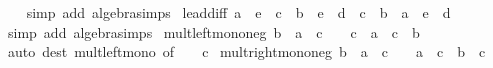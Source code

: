 \begin{isabellebody}
%
\isadelimproof
\ \ %
\endisadelimproof
%
\isatagproof
{}\isamarkupfalse%
\ {\isacharparenleft}{\kern0pt}simp\ add{\isacharcolon}{\kern0pt}\ algebra{\isacharunderscore}{\kern0pt}simps{\isacharparenright}{\kern0pt}%
\endisatagproof
{\isafoldproof}%
%
\isadelimproof
\isanewline
%
\endisadelimproof
\isanewline
{}\isamarkupfalse%
\ le{\isacharunderscore}{\kern0pt}add{\isacharunderscore}{\kern0pt}iff{}{\isacharcolon}{\kern0pt}\ {\isachardoublequoteopen}a\ {\isacharasterisk}{\kern0pt}\ e\ {\isacharplus}{\kern0pt}\ c\ {\isasymle}\ b\ {\isacharasterisk}{\kern0pt}\ e\ {\isacharplus}{\kern0pt}\ d\ {\isasymlongleftrightarrow}\ c\ {\isasymle}\ {\isacharparenleft}{\kern0pt}b\ {\isacharminus}{\kern0pt}\ a{\isacharparenright}{\kern0pt}\ {\isacharasterisk}{\kern0pt}\ e\ {\isacharplus}{\kern0pt}\ d{\isachardoublequoteclose}\isanewline
%
\isadelimproof
\ \ %
\endisadelimproof
%
\isatagproof
{}\isamarkupfalse%
\ {\isacharparenleft}{\kern0pt}simp\ add{\isacharcolon}{\kern0pt}\ algebra{\isacharunderscore}{\kern0pt}simps{\isacharparenright}{\kern0pt}%
\endisatagproof
{\isafoldproof}%
%
\isadelimproof
\isanewline
%
\endisadelimproof
\isanewline
{}\isamarkupfalse%
\ mult{\isacharunderscore}{\kern0pt}left{\isacharunderscore}{\kern0pt}mono{\isacharunderscore}{\kern0pt}neg{\isacharcolon}{\kern0pt}\ {\isachardoublequoteopen}b\ {\isasymle}\ a\ {\isasymLongrightarrow}\ c\ {\isasymle}\ {}\ {\isasymLongrightarrow}\ c\ {\isacharasterisk}{\kern0pt}\ a\ {\isasymle}\ c\ {\isacharasterisk}{\kern0pt}\ b{\isachardoublequoteclose}\isanewline
%
\isadelimproof
\ \ %
\endisadelimproof
%
\isatagproof
{}\isamarkupfalse%
\ {\isacharparenleft}{\kern0pt}auto\ dest{\isacharcolon}{\kern0pt}\ mult{\isacharunderscore}{\kern0pt}left{\isacharunderscore}{\kern0pt}mono\ {\isacharbrackleft}{\kern0pt}of\ {\isacharunderscore}{\kern0pt}\ {\isacharunderscore}{\kern0pt}\ {\isachardoublequoteopen}{\isacharminus}{\kern0pt}\ c{\isachardoublequoteclose}{\isacharbrackright}{\kern0pt}{\isacharparenright}{\kern0pt}%
\endisatagproof
{\isafoldproof}%
%
\isadelimproof
\isanewline
%
\endisadelimproof
\isanewline
{}\isamarkupfalse%
\ mult{\isacharunderscore}{\kern0pt}right{\isacharunderscore}{\kern0pt}mono{\isacharunderscore}{\kern0pt}neg{\isacharcolon}{\kern0pt}\ {\isachardoublequoteopen}b\ {\isasymle}\ a\ {\isasymLongrightarrow}\ c\ {\isasymle}\ {}\ {\isasymLongrightarrow}\ a\ {\isacharasterisk}{\kern0pt}\ c\ {\isasymle}\ b\ {\isacharasterisk}{\kern0pt}\ c{\isachardoublequoteclose}\isanewline
%
\isadelimproof

\end{isabellebody}
